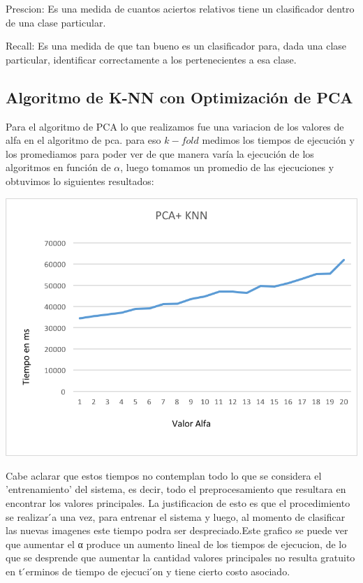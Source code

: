 Prescion: Es una medida de cuantos aciertos relativos tiene un clasificador dentro de una clase particular.

Recall: Es una medida de que tan bueno es un clasificador para, dada una clase particular, identificar correctamente a los pertenecientes a esa clase.


\subsection {Algoritmo de K-NN con Optimización de PCA}
Para el algoritmo de PCA lo que realizamos fue una variacion de los valores de alfa en el algoritmo de pca. para eso $k-fold$ medimos los tiempos de ejecución y los promediamos para poder ver de que manera varía la ejecución de los algoritmos en función de $\alpha$, luego tomamos un promedio de las ejecuciones y obtuvimos lo siguientes resultados:

\begin{center}
\includegraphics[scale=0.6]{pcaknn.png}
\end{center}

Cabe aclarar que estos tiempos no contemplan todo lo que se considera el ’entrenamiento’ del sistema, es decir, todo el preprocesamiento que resultara en encontrar
los valores principales. La justificacion de esto es que el procedimiento se realizar ́a una vez, para entrenar el sistema y luego, al momento de clasificar las
nuevas imagenes este tiempo podra ser despreciado.Este grafico se puede ver que aumentar el α produce un aumento lineal de los tiempos de ejecucion, 
de lo que se desprende que aumentar la cantidad valores principales no resulta gratuito en t ́erminos de tiempo de ejecuci ́on y tiene cierto costo asociado.



